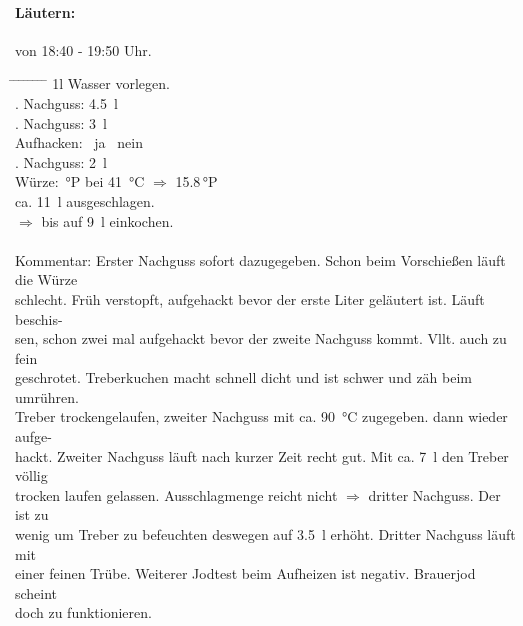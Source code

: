 \documentclass[12pt,oneside,a4paper]{scrartcl}
\begin{document}
\paragraph{Läutern:} von 18:40 - 19:50 Uhr.
	\begin{tabbing}
		\hspace{1cm} \= \hspace{1cm} \= \hspace{1cm} \= \hspace{1cm} \= \hspace{1cm} \=\hspace{1cm} \=\hspace{1cm} \=\hspace{1cm} \= \kill
		\> 1l Wasser vorlegen.\\
		\> . Nachguss: \> \> \> \SI{4,5}{\litre}\\
		\> . Nachguss: \> \> \> \SI{3}{\litre}\\
		\> \> \> Aufhacken: \> \> \CheckedBox \ ja \> \> \Square \ nein\\
		\> . Nachguss: \> \> \> \SI{2}{\litre}\\
		\> Würze: \> \> \,°P\> bei \> \SI{41}{\celsius} \> $\Rightarrow$ \> \num{15,8}\,°P\\
		\> \> \> ca. \SI{11}{\litre} ausgeschlagen.\\
		\> \> \> $\Rightarrow$ bis auf \SI{9}{\litre} einkochen.\\ \\
		\> Kommentar: \>\>\>Erster Nachguss sofort dazugegeben. Schon beim Vorschießen läuft die Würze\\
		\>\>\>schlecht. Früh verstopft, aufgehackt bevor der erste Liter geläutert ist. Läuft beschis-\\
		\>\>\>sen, schon zwei mal aufgehackt bevor der zweite Nachguss kommt. Vllt. auch zu fein\\
		\>\>\>geschrotet. Treberkuchen macht schnell dicht und ist schwer und zäh beim umrühren.\\
		\>\>\>Treber trockengelaufen, zweiter Nachguss mit ca. \SI{90}{\celsius} zugegeben. dann wieder aufge-\\
		\>\>\>hackt. Zweiter Nachguss läuft nach kurzer Zeit recht gut. Mit ca. \SI{7}{\litre} den Treber völlig\\
		\> \> \>trocken laufen gelassen. Ausschlagmenge reicht nicht $\Rightarrow$ dritter Nachguss. Der ist zu \\
		\> \> \>wenig um Treber zu befeuchten deswegen auf \SI{3,5}{\litre} erhöht. Dritter Nachguss läuft mit\\
		\> \> \>einer feinen Trübe. Weiterer Jodtest beim Aufheizen ist negativ. Brauerjod scheint\\
		\> \> \>doch zu funktionieren.\\
	\end{tabbing}
\end{document}
